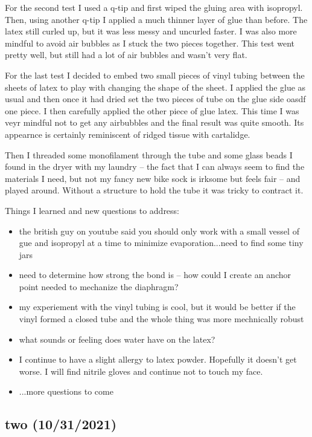 \documentclass[11pt]{report}
\begin{document}
\begin{itmemize}
For the second test I used a q-tip and first wiped the gluing area with isopropyl. Then, using another q-tip I applied a much thinner layer of glue than before. The latex still curled up, but it was less messy and uncurled faster. I was also more mindful to avoid air bubbles as I stuck the two pieces together. This test went pretty well, but still had a lot of air bubbles and wasn't very flat.

For the last test I decided to embed two small pieces of vinyl tubing between the sheets of latex to play with changing the shape of the sheet. I applied the glue as usual and then once it had dried set the two pieces of tube on the glue side oasdf one piece. I then carefully applied the other piece of glue latex. This time I was veyr mindful not to get any airbubbles and the final result was quite smooth. Its appearnce is certainly reminiscent of ridged tissue with cartalidge.

Then I threaded some monofilament through the tube and some glass beads I found in the dryer with my laundry -- the fact that I can always seem to find the materials I need, but not my fancy new bike sock is irksome but feels fair -- and played around. Without a structure to hold the tube it was tricky to contract it. 



Things I learned and new questions to address:
\begin{itemize}
\item
the british guy on youtube said you should only work with a small vessel of gue and isopropyl at a time to minimize evaporation...need to find some tiny jars
\item
need to determine how strong the bond is -- how could I create an anchor point needed to mechanize the diaphragm?
\item
my experiement with the vinyl tubing is cool, but it would be better if the vinyl formed a closed tube and the whole thing was more mechnically robust
\item
what sounds or feeling does water have on the latex?
\item
I continue to have a slight allergy to latex powder. Hopefully it doesn't get worse. I will find nitrile gloves and continue not to touch my face.
\item
...more questions to come
\end{itemize}


\newpage
\subsection*{two (10/31/2021)}


\end{itmemize}
\end{document}
